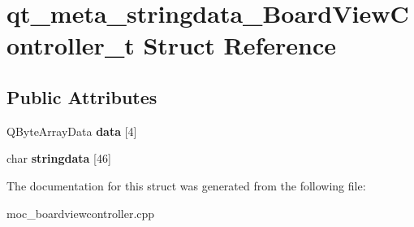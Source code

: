 \hypertarget{structqt__meta__stringdata__BoardViewController__t}{\section{qt\-\_\-meta\-\_\-stringdata\-\_\-\-Board\-View\-Controller\-\_\-t Struct Reference}
\label{structqt__meta__stringdata__BoardViewController__t}
}
\subsection*{Public Attributes}
\begin{DoxyCompactItemize}
\item 
\hypertarget{structqt__meta__stringdata__BoardViewController__t_ae7a56ee0860569e56c7c20496e44966e}{Q\-Byte\-Array\-Data {\bfseries data} \mbox{[}4\mbox{]}}\label{structqt__meta__stringdata__BoardViewController__t_ae7a56ee0860569e56c7c20496e44966e}

\item 
\hypertarget{structqt__meta__stringdata__BoardViewController__t_a7d51c9146821f9d15cec080594c4a3c1}{char {\bfseries stringdata} \mbox{[}46\mbox{]}}\label{structqt__meta__stringdata__BoardViewController__t_a7d51c9146821f9d15cec080594c4a3c1}

\end{DoxyCompactItemize}


The documentation for this struct was generated from the following file\-:\begin{DoxyCompactItemize}
\item 
moc\-\_\-boardviewcontroller.\-cpp\end{DoxyCompactItemize}
